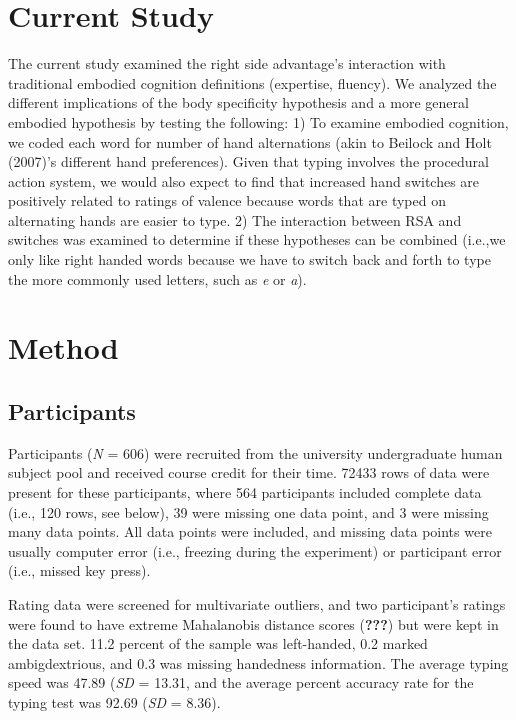 \documentclass[english,man]{apa6}
\theoremstyle{definition}
\theoremstyle{definition}
\theoremstyle{definition}
\theoremstyle{remark}
\begin{document}
\section{Current Study}\label{current-study}

The current study examined the right side advantage's interaction with
traditional embodied cognition definitions (expertise, fluency). We
analyzed the different implications of the body specificity hypothesis
and a more general embodied hypothesis by testing the following: 1) To
examine embodied cognition, we coded each word for number of hand
alternations (akin to Beilock and Holt (2007)'s different hand
preferences). Given that typing involves the procedural action system,
we would also expect to find that increased hand switches are positively
related to ratings of valence because words that are typed on
alternating hands are easier to type. 2) The interaction between RSA and
switches was examined to determine if these hypotheses can be combined
(i.e.,we only like right handed words because we have to switch back and
forth to type the more commonly used letters, such as \emph{e} or
\emph{a}).

\section{Method}\label{method}

\subsection{Participants}\label{participants}

Participants (\emph{N} = 606) were recruited from the university
undergraduate human subject pool and received course credit for their
time. 72433 rows of data were present for these participants, where 564
participants included complete data (i.e., 120 rows, see below), 39 were
missing one data point, and 3 were missing many data points. All data
points were included, and missing data points were usually computer
error (i.e., freezing during the experiment) or participant error (i.e.,
missed key press).

Rating data were screened for multivariate outliers, and two
participant's ratings were found to have extreme Mahalanobis distance
scores ({\textbf{???}}) but were kept in the data set. 11.2 percent of
the sample was left-handed, 0.2 marked ambigdextrious, and 0.3 was
missing handedness information. The average typing speed was 47.89
(\emph{SD} = 13.31, and the average percent accuracy rate for the typing
test was 92.69 (\emph{SD} = 8.36).
\end{document}
